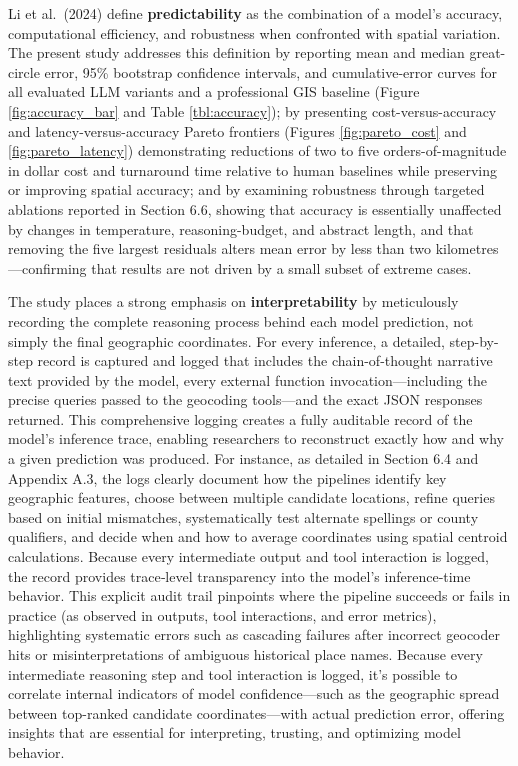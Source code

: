 Li et al.~(2024) define \textbf{predictability} as the combination of a
model's accuracy, computational efficiency, and robustness when
confronted with spatial variation. The present study addresses this
definition by reporting mean and median great-circle error, 95\%
bootstrap confidence intervals, and cumulative-error curves for all
evaluated LLM variants and a professional GIS baseline (Figure
\ref{fig:accuracy_bar} and Table \ref{tbl:accuracy}); by presenting
cost-versus-accuracy and latency-versus-accuracy Pareto frontiers
(Figures \ref{fig:pareto_cost} and \ref{fig:pareto_latency})
demonstrating reductions of two to five orders-of-magnitude in dollar
cost and turnaround time relative to human baselines while preserving or
improving spatial accuracy; and by examining robustness through targeted
ablations reported in Section 6.6, showing that accuracy is essentially
unaffected by changes in temperature, reasoning-budget, and abstract
length, and that removing the five largest residuals alters mean error
by less than two kilometres---confirming that results are not driven by
a small subset of extreme cases.

The study places a strong emphasis on \textbf{interpretability} by
meticulously recording the complete reasoning process behind each model
prediction, not simply the final geographic coordinates. For every
inference, a detailed, step-by-step record is captured and logged that
includes the chain-of-thought narrative text provided by the model,
every external function invocation---including the precise queries
passed to the geocoding tools---and the exact JSON responses returned.
This comprehensive logging creates a fully auditable record of the
model's inference trace, enabling researchers to reconstruct exactly how
and why a given prediction was produced. For instance, as detailed in
Section 6.4 and Appendix A.3, the logs clearly document how the
pipelines identify key geographic features, choose between multiple
candidate locations, refine queries based on initial mismatches,
systematically test alternate spellings or county qualifiers, and decide
when and how to average coordinates using spatial centroid calculations.
Because every intermediate output and tool interaction is logged, the
record provides trace‑level transparency into the model's inference‑time
behavior. This explicit audit trail pinpoints where the pipeline
succeeds or fails in practice (as observed in outputs, tool
interactions, and error metrics), highlighting systematic errors such as
cascading failures after incorrect geocoder hits or misinterpretations
of ambiguous historical place names. Because every intermediate
reasoning step and tool interaction is logged, it's possible to
correlate internal indicators of model confidence---such as the
geographic spread between top-ranked candidate coordinates---with actual
prediction error, offering insights that are essential for interpreting,
trusting, and optimizing model behavior.


